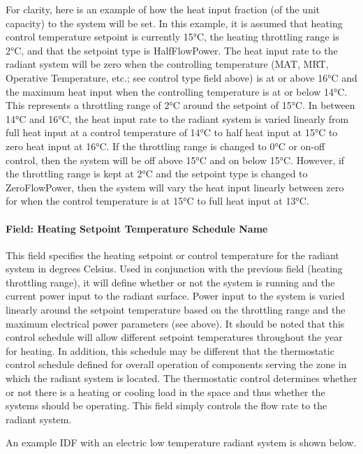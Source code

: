 For clarity, here is an example of how the heat input fraction (of the unit capacity) to the system will be set.  In this example, it is assumed that heating control temperature setpoint is currently 15°C, the heating throttling range is 2°C, and that the setpoint type is HalfFlowPower.  The heat input rate to the radiant system will be zero when the controlling temperature (MAT, MRT, Operative Temperature, etc.; see control type field above) is at or above 16°C and the maximum heat input when the controlling temperature is at or below 14°C. This represents a throttling range of 2°C around the setpoint of 15°C. In between 14°C and 16°C, the heat input rate to the radiant system is varied linearly from full heat input at a control temperature of 14°C to half heat input at 15°C to zero heat input at 16°C.  If the throttling range is changed to 0°C or on-off control, then the system will be off above 15°C and on below 15°C.  However, if the throttling range is kept at 2°C and the setpoint type is changed to ZeroFlowPower, then the system will vary the heat input linearly between zero for when the control temperature is at 15°C to full heat input at 13°C.

\paragraph{Field: Heating Setpoint Temperature Schedule Name}\label{field-heating-setpoint-temperature-schedule-name}

This field specifies the heating setpoint or control temperature for the radiant system in degrees Celsius. Used in conjunction with the previous field (heating throttling range), it will define whether or not the system is running and the current power input to the radiant surface. Power input to the system is varied linearly around the setpoint temperature based on the throttling range and the maximum electrical power parameters (see above). It should be noted that this control schedule will allow different setpoint temperatures throughout the year for heating. In addition, this schedule may be different that the thermostatic control schedule defined for overall operation of components serving the zone in which the radiant system is located. The thermostatic control determines whether or not there is a heating or cooling load in the space and thus whether the systems should be operating. This field simply controls the flow rate to the radiant system.

An example IDF with an electric low temperature radiant system is shown below.

